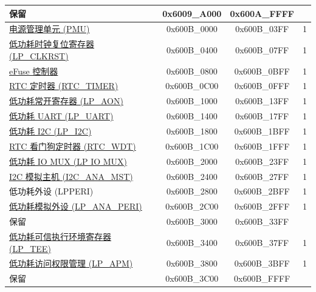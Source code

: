 \begin{ThreePartTable}
\begin{longtable}[c]{ |p{7cm}|c|c|r| }
    \rowcolor{gray!25}  保留                    & 0x6009\_A000 & 0x600A\_FFFF &         \\\hline
\hyperref[mod:lowpowm]{电源管理单元 (PMU)} & 0x600B\_0000 & 0x600B\_03FF &   1     \\\hline
\hyperref[mod:resclk]{低功耗时钟复位寄存器 (LP\_CLKRST)}                  & 0x600B\_0400 & 0x600B\_07FF &   1     \\\hline
\hyperref[mod:efuse]{eFuse 控制器}                       & 0x600B\_0800 & 0x600B\_0BFF &   1     \\\hline
\hyperref[mod:lowpowm]{RTC 定时器 (RTC\_TIMER)}                   & 0x600B\_0C00 & 0x600B\_0FFF &   1     \\\hline
\hyperref[mod:lowpowm]{低功耗常开寄存器 (LP\_AON)}                     & 0x600B\_1000 & 0x600B\_13FF &   1     \\\hline
\hyperref[mod:uart]{低功耗 UART (LP\_UART)}                    & 0x600B\_1400 & 0x600B\_17FF &   1     \\\hline
\hyperref[mod:i2c]{低功耗 I2C (LP\_I2C)}                     & 0x600B\_1800 & 0x600B\_1BFF &   1     \\\hline
\hyperref[mod:wdt]{RTC 看门狗定时器 (RTC\_WDT)}                     & 0x600B\_1C00 & 0x600B\_1FFF &   1     \\\hline
\hyperref[mod:iomuxgpio]{低功耗 IO MUX (LP IO MUX)}                     & 0x600B\_2000 & 0x600B\_23FF &   1     \\\hline
\hyperref[mod:lowpowm]{I2C 模拟主机 (I2C\_ANA\_MST)}
& 0x600B\_2400 & 0x600B\_27FF &   1     \\\hline
低功耗外设 (LPPERI)                      & 0x600B\_2800 & 0x600B\_2BFF &   1     \\\hline
\hyperref[mod:lowpowm]{低功耗模拟外设 (LP\_ANA\_PERI)}               & 0x600B\_2C00 & 0x600B\_2FFF &   1     \\\hline
    \rowcolor{gray!25}  保留                    & 0x600B\_3000 & 0x600B\_33FF &         \\\hline
\hyperref[mod:permctrl]{低功耗可信执行环境寄存器 (LP\_TEE)}\tnote{\textcolor{red}{*}}                     & 0x600B\_3400 & 0x600B\_37FF &   1    \\\hline
\hyperref[mod:permctrl]{低功耗访问权限管理 (LP\_APM)}\tnote{\textcolor{red}{*}}                     & 0x600B\_3800 & 0x600B\_3BFF &   1     \\\hline
    \rowcolor{gray!25}  保留                    & 0x600B\_3C00 & 0x600B\_FFFF &         \\\hline

\end{longtable}
\end{ThreePartTable}
